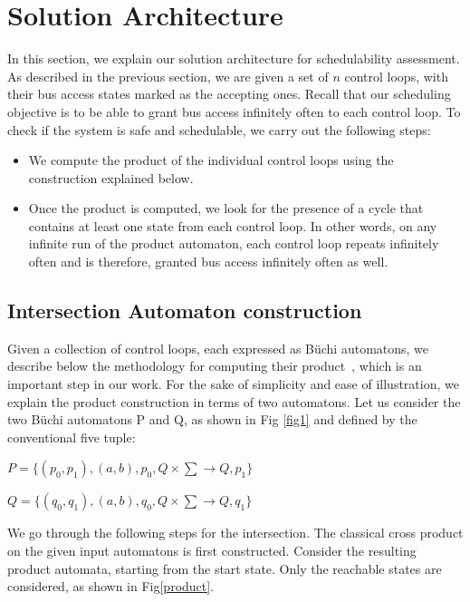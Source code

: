 \section{Solution Architecture} \label{sec4}
\noindent
In this section, we explain our solution architecture for schedulability assessment. As described in the previous section, we are given a set of $n$ control loops, with their bus access states marked as the accepting ones. Recall that our scheduling objective is to be able to grant bus access infinitely often to each control loop. To check if the system is safe and schedulable, we carry out the following steps: 

\begin{itemize}

\item We compute the product of the individual control loops using the construction explained below. 

\item Once the product is computed, we look for the presence of a cycle that contains at least one state from each control loop. In other words, on any infinite run of the product automaton, each control loop repeats infinitely often and is therefore, granted bus access infinitely often as well. 

\end{itemize}


\subsection{Intersection Automaton construction}
\noindent
Given a collection of control loops, each expressed as B\"{u}chi automatons, we describe below the methodology for computing their product~\cite{DBLP:books/ws/automata2012/ChevalierDMP12}, which is an important step in our work. For the sake of simplicity and ease of illustration, we explain the product construction in terms of two automatons. 
Let us consider the two B\"{u}chi automatons P and Q, as shown in Fig \ref{fig1} and defined by the
conventional five tuple:

$P = \{(p_0,p_1),(a,b),p_0, Q \times \sum \rightarrow Q,p_1\}$

$Q = \{(q_0,q_1),(a,b),q_0, Q \times \sum \rightarrow Q,q_1\}$


\noindent
We go through the 
following steps for the intersection. 
The classical cross product on the given input automatons is first constructed. Consider the resulting product automata, starting from the start state. Only the reachable states are considered, as shown in Fig\ref{product}.

